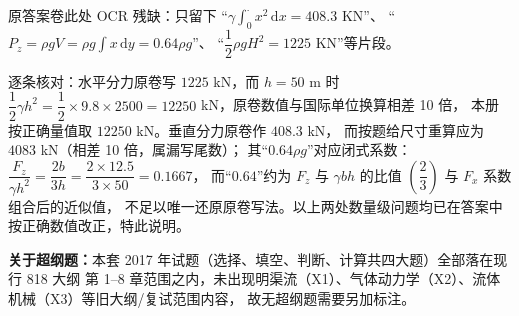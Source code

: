 \begin{tishi}
原答案卷此处 OCR 残缺：只留下 “$\gamma\displaystyle\int_0^{\cdot}x^2\,\mathrm{d}x=408.3$ KN”、
“$P_z=\rho gV=\rho g\displaystyle\int x\,\mathrm{d}y=0.64\rho g$”、
“$\dfrac{1}{2}\rho gH^2=1225$ KN”等片段。

逐条核对：水平分力原卷写 $1225$ kN，而 $h=50$ m 时
$\dfrac{1}{2}\gamma h^2=\dfrac{1}{2}\times9.8\times2500=12250$ kN，原卷数值与国际单位换算相差 10 倍，
本册按正确量值取 $12250$ kN。垂直分力原卷作 $408.3$ kN，
而按题给尺寸重算应为 $4083$ kN（相差 10 倍，属漏写尾数）；
其“$0.64\rho g$”对应闭式系数：$\dfrac{F_z}{\gamma h^2}=\dfrac{2b}{3h}=\dfrac{2\times12.5}{3\times50}=0.1667$，
而“$0.64$”约为 $F_z$ 与 $\gamma b h$ 的比值 $\left(\dfrac{2}{3}\right)$ 与 $F_x$ 系数组合后的近似值，
不足以唯一还原原卷写法。以上两处数量级问题均已在答案中按正确数值改正，特此说明。
\end{tishi}

\begin{tishi}
\textbf{关于超纲题：}本套 2017 年试题（选择、填空、判断、计算共四大题）全部落在现行 818 大纲
第 1--8 章范围之内，未出现明渠流（X1）、气体动力学（X2）、流体机械（X3）等旧大纲/复试范围内容，
故无超纲题需要另加标注。
\end{tishi}
